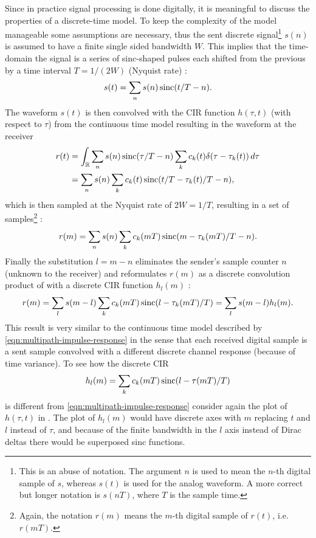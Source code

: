 Since in practice signal processing is done digitally, it is meaningful to discuss the properties of a discrete-time model. To keep the complexity of the model manageable some assumptions are necessary, thus the sent discrete signal\footnote{This is an abuse of notation. The argument \(n\) is used to mean the \(n\)-th digital sample of \(s\), whereas \(s(t)\) is used for the analog waveform. A more correct but longer notation is \(s(nT)\), where \(T\) is the sample time.} \(s(n)\) is assumed to have a finite single sided bandwidth \(W\). This implies that the time-domain the signal is a series of sinc-shaped pulses each shifted from the previous by a time interval \(T = 1 / (2W)\) (Nyquist rate) \cite{Messier}:
\begin{equation}
	s(t) = \sum_n s(n) \operatorname{sinc}(t/T - n).
\end{equation}
The waveform \(s(t)\) is then convolved with the CIR function \(h(\tau, t)\) (with respect to \(\tau\)) from the continuous time model resulting in the waveform at the receiver
\begin{align*}
	r(t) &= \int_ \mathbb{R} \sum_n s(n) \operatorname{sinc}(\tau / T - n) \sum_k c_k(t) \delta(\tau - \tau_k(t)) \,d\tau \\
	&= \sum_n s(n) \sum_k c_k(t) \operatorname{sinc}(t/T - \tau_k(t)/T - n),
\end{align*}
which is then sampled at the Nyquist rate of \(2W = 1/T\), resulting in a set of samples\footnote{Again, the notation \(r(m)\) means the \(m\)-th digital sample of \(r(t)\), i.e. \(r(mT)\).} \cite{Messier}:
\[
	r(m) = \sum_n s(n) \sum_k c_k(mT) \operatorname{sinc}(m - \tau_k(mT)/T - n).
\]
Finally the substitution \(l = m - n\) eliminates the sender's sample counter \(n\) (unknown to the receiver) and reformulates \(r(m)\) as a discrete convolution product of with a discrete CIR function \(h_l(m)\) \cite{Messier}:
\begin{equation}
	r(m) = \sum_l s(m - l) \sum_k c_k(mT) \operatorname{sinc}(l - \tau_k(mT)/T) 
	= \sum_l s(m - l) h_l (m).
\end{equation}
This result is very similar to the continuous time model described by \eqref{eqn:multipath-impulse-response} in the sense that each received digital sample is a sent sample convolved with a different discrete channel response (because of time variance). To see how the discrete CIR
\begin{equation} \label{eqn:discrete-multipath-impulse-response}
	h_l(m) = \sum_k c_k(mT) \operatorname{sinc}(l - \tau(mT)/T)
\end{equation}
is different from \eqref{eqn:multipath-impulse-response} consider again the plot of \(h(\tau,t)\) in . The plot of \(h_l(m)\) would have discrete axes with \(m\) replacing \(t\) and \(l\) instead of \(\tau\), and because of the finite bandwidth in the \(l\) axis instead of Dirac deltas there would be superposed sinc functions.

